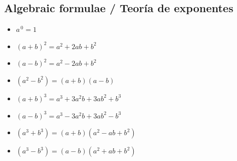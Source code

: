 \documentclass[12pt, a5paper]{article}
\begin{document}
\subsection*{Algebraic formulae / Teoría de exponentes}

\begin{itemize}
	\item{$a^{\,0} = 1$}
	\item{$(a + b)^2 = a^2 + 2ab + b^2$}
	\item{$(a - b)^2 = a^2 - 2ab + b^2$}
	\item{$(a^2 - b^2) = (a + b)(a - b)$}
	\item{$(a + b)^3 = a^3 + 3a^2b + 3ab^2 + b^3$}
	\item{$(a - b)^3 = a^3 - 3a^2b + 3ab^2 - b^3$}
	\item{$(a^3 + b^3) = (a + b)(a^2 - ab + b^2)$}
	\item{$(a^3 - b^3) = (a - b)(a^2 + ab + b^2)$}
\end{itemize}
\end{document}
